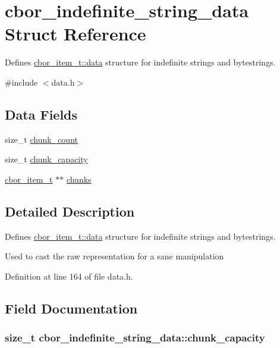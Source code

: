 \hypertarget{structcbor__indefinite__string__data}{\section{cbor\-\_\-indefinite\-\_\-string\-\_\-data Struct Reference}
\label{structcbor__indefinite__string__data}
}


Defines \hyperlink{structcbor__item__t_a5c6dde1dbef5aad748c49786352eef44}{cbor\-\_\-item\-\_\-t\-::data} structure for indefinite strings and bytestrings.  




{\ttfamily \#include $<$data.\-h$>$}

\subsection*{Data Fields}
\begin{DoxyCompactItemize}
\item 
size\-\_\-t \hyperlink{structcbor__indefinite__string__data_a86c3abce37287c14985b5f2a0d1935d7}{chunk\-\_\-count}
\item 
size\-\_\-t \hyperlink{structcbor__indefinite__string__data_a4f07710bcaa663d2babf652fc9984412}{chunk\-\_\-capacity}
\item 
\hyperlink{structcbor__item__t}{cbor\-\_\-item\-\_\-t} $\ast$$\ast$ \hyperlink{structcbor__indefinite__string__data_ac34c0d9bd1447f53149878128e19a414}{chunks}
\end{DoxyCompactItemize}


\subsection{Detailed Description}
Defines \hyperlink{structcbor__item__t_a5c6dde1dbef5aad748c49786352eef44}{cbor\-\_\-item\-\_\-t\-::data} structure for indefinite strings and bytestrings. 

Used to cast the raw representation for a sane manipulation 

Definition at line 164 of file data.\-h.



\subsection{Field Documentation}
\hypertarget{structcbor__indefinite__string__data_a4f07710bcaa663d2babf652fc9984412}{
\subsubsection[{chunk\-\_\-capacity}]{\setlength{\rightskip}{0pt plus 5cm}size\-\_\-t cbor\-\_\-indefinite\-\_\-string\-\_\-data\-::chunk\-\_\-capacity}}\label{structcbor__indefinite__string__data_a4f07710bcaa663d2babf652fc9984412}


